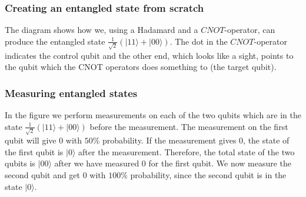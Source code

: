 \documentclass[10pt]{beamer}
\begin{document}
\begin{frame}
  \frametitle{Creating an entangled state from scratch}
  \centerline{	 	
	}
    The diagram shows how we, using a Hadamard and a $CNOT$-operator, can produce the entangled state $\frac{1}{\sqrt{2}}(|11\rangle+|00\rangle)$. The dot in the $CNOT$-operator indicates the control qubit and the other end, which looks like a sight, points to the qubit which the CNOT operators does something to (the target qubit).
    




\end{frame}
\begin{frame}
  \frametitle{Measuring entangled states}
  \centerline{
}
In the figure we perform measurements on each of the two qubits which are in the state $\frac{1}{\sqrt{2}}(|11\rangle+|00\rangle)$ before the measurement.  The measurement on the first qubit will give 0 with $50\%$ probability. If the measurement gives 0, the state of the first qubit is $|0\rangle$ after the measurement. Therefore, the total state of the two qubits is $|00\rangle$ after we have measured 0 for the first qubit. We now measure the second qubit and get 0 with $100\%$ probability, since the second qubit is in the state $|0\rangle$.
\end{frame}
\end{document}
